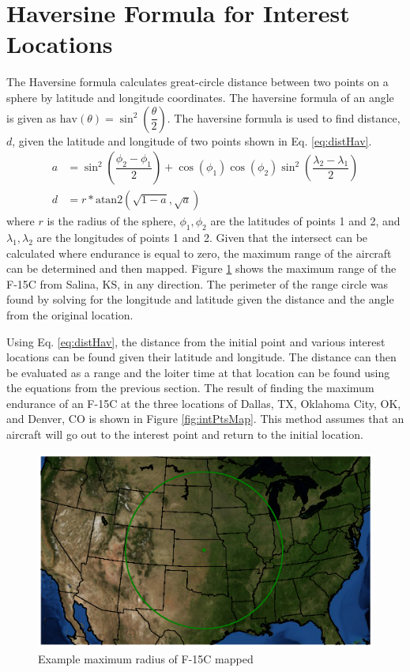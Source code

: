 \section{Haversine Formula for Interest Locations}
\label{section:havMethod}
The Haversine formula calculates great-circle distance between two points on a sphere by latitude and longitude coordinates. The haversine formula of an angle is given as $\text{hav}(\theta) = \sin^2\left(\dfrac{\theta}{2}\right)$. The haversine formula is used to find distance, $d$, given the latitude and longitude of two points shown in Eq. \ref{eq:distHav}. 
\begin{equation}
\begin{aligned}
    a &= \sin^2\left(\dfrac{\phi_2-\phi_1}{2}\right)+\cos(\phi_1)\cos(\phi_2)\sin^2\left(\dfrac{\lambda_2-\lambda_1}{2}\right)
    \label{eq:distHav}\\
    d &= r*\text{atan2}(\sqrt{1-a},\sqrt{a})
\end{aligned}
\end{equation}
where $r$ is the radius of the sphere, $\phi_1,\phi_2$ are the latitudes of points 1 and 2, and $\lambda_1,\lambda_2$ are the longitudes of points 1 and 2. Given that the intersect can be calculated where endurance is equal to zero, the maximum range of the aircraft can be determined and then mapped. Figure \ref{fig:maxRadius} shows the maximum range of the F-15C from Salina, KS, in any direction. The perimeter of the range circle was found by solving for the longitude and latitude given the distance and the angle from the original location. \par
Using Eq. \ref{eq:distHav}, the distance from the initial point and various interest locations can be found given their latitude and longitude. The distance can then be evaluated as a range and the loiter time at that location can be found using the equations from the previous section. The result of finding the maximum endurance of an F-15C at the three locations of Dallas, TX, Oklahoma City, OK, and Denver, CO is shown in Figure \ref{fig:intPtsMap}. This method assumes that an aircraft will go out to the interest point and return to the initial location.
\begin{figure}
    \centering
    \includegraphics[width = 13cm]{Thesis/Method/RadiusEx.eps}
    \caption{Example maximum radius of F-15C mapped}
    \label{fig:maxRadius}
\end{figure}
